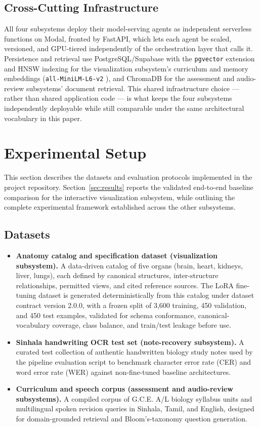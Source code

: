\documentclass[conference]{IEEEtran}
\begin{document}
\subsection{Cross-Cutting Infrastructure}

All four subsystems deploy their model-serving agents as independent serverless functions on Modal, fronted by FastAPI, which lets each agent be scaled, versioned, and GPU-tiered independently of the orchestration layer that calls it. Persistence and retrieval use PostgreSQL/Supabase with the \texttt{pgvector} extension and HNSW indexing \cite{hnsw} for the visualization subsystem's curriculum and memory embeddings (\texttt{all-MiniLM-L6-v2} \cite{sbert}), and ChromaDB for the assessment and audio-review subsystems' document retrieval. This shared infrastructure choice --- rather than shared application code --- is what keeps the four subsystems independently deployable while still comparable under the same architectural vocabulary in this paper.

\section{Experimental Setup}
\label{sec:setup}

This section describes the datasets and evaluation protocols implemented in the project repository. Section~\ref{sec:results} reports the validated end-to-end baseline comparison for the interactive visualization subsystem, while outlining the complete experimental framework established across the other subsystems.

\subsection{Datasets}

\begin{itemize}
\item \textbf{Anatomy catalog and specification dataset (visualization subsystem).} A data-driven catalog of five organs (brain, heart, kidneys, liver, lungs), each defined by canonical structures, inter-structure relationships, permitted views, and cited reference sources. The LoRA fine-tuning dataset is generated deterministically from this catalog under dataset contract version 2.0.0, with a frozen split of 3{,}600 training, 450 validation, and 450 test examples, validated for schema conformance, canonical-vocabulary coverage, class balance, and train/test leakage before use.
\item \textbf{Sinhala handwriting OCR test set (note-recovery subsystem).} A curated test collection of authentic handwritten biology study notes used by the pipeline evaluation script to benchmark character error rate (CER) and word error rate (WER) against non-fine-tuned baseline architectures.
\item \textbf{Curriculum and speech corpus (assessment and audio-review subsystems).} A compiled corpus of G.C.E. A/L biology syllabus units and multilingual spoken revision queries in Sinhala, Tamil, and English, designed for domain-grounded retrieval and Bloom's-taxonomy question generation.
\end{itemize}
\end{document}
